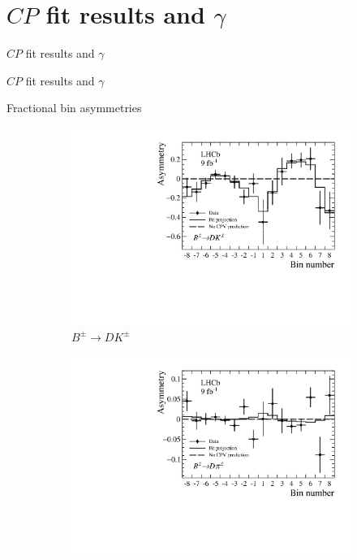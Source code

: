 \documentclass{beamer}
\begin{document}
\section{\texorpdfstring{$C\!P$}{CP} fit results and \texorpdfstring{$\gamma$}{gamma}}
\begin{frame}{$C\!P$ fit results and $\gamma$}
  \begin{center}
    {\huge $C\!P$ fit results and $\gamma$}
  \end{center}
\end{frame}

\begin{frame}{Fractional bin asymmetries}
  \begin{figure}
    \centering
    \vspace{-0.2cm}
    \begin{subfigure}{0.5\textwidth}
      \includegraphics[width = 1.0\textwidth]{Plots/BinAsymmetries_dk.pdf}
      \caption{$B^\pm\to DK^\pm$}
    \end{subfigure}%
    \begin{subfigure}{0.5\textwidth}
      \includegraphics[width = 1.0\textwidth]{Plots/BinAsymmetries_dpi.pdf}

\end{subfigure}
\end{figure}
\end{frame}
\end{document}
